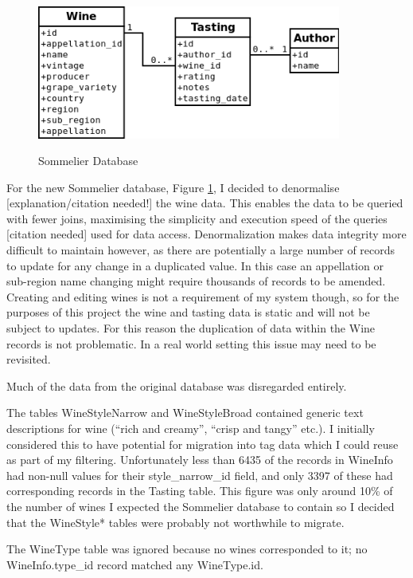 
\begin{figure}[h!]
    \caption{Sommelier Database}
    \centering
        \includegraphics[width=10cm]{SommelierDBSimple}
    \label{fig:sommelierdb}
\end{figure}

For the new Sommelier database, Figure \ref{fig:sommelierdb}, I decided to denormalise [explanation/citation needed!] the wine data. This enables the data to be queried with fewer joins, maximising the simplicity and execution speed of the queries [citation needed] used for data access. Denormalization makes data integrity more difficult to maintain however, as there are potentially a large number of records to update for any change in a duplicated value. In this case an appellation or sub-region name changing might require thousands of records to be amended. Creating and editing wines is not a requirement of my system though, so for the purposes of this project the wine and tasting data is static and will not be subject to updates. For this reason the duplication of data within the Wine records is not problematic. In a real world setting this issue may need to be revisited.

Much of the data from the original database was disregarded entirely.

The tables WineStyleNarrow and WineStyleBroad contained generic text descriptions for wine (``rich and creamy'', ``crisp and tangy'' etc.). I initially considered this to have potential for migration into tag data which I could reuse as part of my filtering. Unfortunately less than 6435 of the records in WineInfo had non-null values for their style\_narrow\_id field, and only 3397 of these had corresponding records in the Tasting table. This figure was only around 10\% of the number of wines I expected the Sommelier database to contain so I decided that the WineStyle* tables were probably not worthwhile to migrate.

The WineType table was ignored because no wines corresponded to it; no WineInfo.type\_id record matched any WineType.id.

